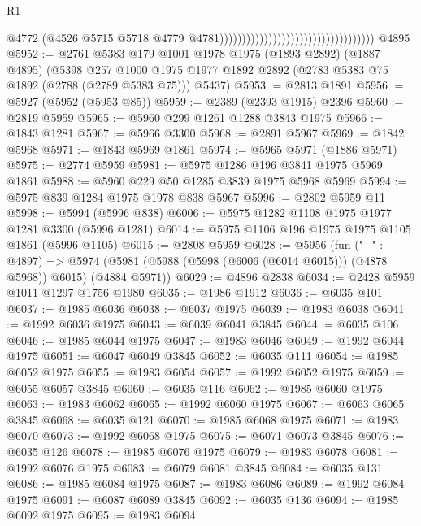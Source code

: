 \begin{lexlean}{R1}
\begin{coremodule}
                                                                        @4772
                                                                        (@4526
                                                                          @5715
                                                                          @5718
                                                                          @4779
                                                                          @4781)))))))))))))))))))))))))))))))))))
    @4895
@5952 := @2761
    @5383
    @179
    @1001
    @1978
    @1975
    (@1893 @2892)
    (@1887 @4895)
    (@5398
      @257
      @1000
      @1975
      @1977
      @1892
      @2892
      (@2783 @5383 @75 @1892 (@2788 (@2789 @5383 @75)))
      @5437)
@5953 := @2813 @1891
@5956 := @5927 (@5952 (@5953 @85))
@5959 := @2389 (@2393 @1915) @2396
@5960 := @2819 @5959
@5965 := @5960 @299 @1261 @1288 @3843 @1975
@5966 := @1843 @1281
@5967 := @5966 @3300
@5968 := @2891 @5967
@5969 := @1842 @5968
@5971 := @1843 @5969 @1861
@5974 := @5965 @5971 (@1886 @5971)
@5975 := @2774 @5959
@5981 := @5975 @1286 @196 @3841 @1975 @5969 @1861
@5988 := @5960 @229 @50 @1285 @3839 @1975 @5968 @5969
@5994 := @5975 @839 @1284 @1975 @1978 @838 @5967
@5996 := @2802 @5959 @11
@5998 := @5994 (@5996 @838)
@6006 := @5975 @1282 @1108 @1975 @1977 @1281 @3300 (@5996 @1281)
@6014 := @5975 @1106 @196 @1975 @1975 @1105 @1861 (@5996 @1105)
@6015 := @2808 @5959
@6028 := @5956
    (fun ("_" : @4897) =>
    @5974 (@5981 (@5988 (@5998 (@6006 (@6014 @6015))) (@4878 @5968)) @6015) (@4884 @5971))
@6029 := @4896 @2838
@6034 := @2428 @5959 @1011 @1297 @1756 @1980
@6035 := @1986 @1912
@6036 := @6035 @101
@6037 := @1985 @6036
@6038 := @6037 @1975
@6039 := @1983 @6038
@6041 := @1992 @6036 @1975
@6043 := @6039 @6041 @3845
@6044 := @6035 @106
@6046 := @1985 @6044 @1975
@6047 := @1983 @6046
@6049 := @1992 @6044 @1975
@6051 := @6047 @6049 @3845
@6052 := @6035 @111
@6054 := @1985 @6052 @1975
@6055 := @1983 @6054
@6057 := @1992 @6052 @1975
@6059 := @6055 @6057 @3845
@6060 := @6035 @116
@6062 := @1985 @6060 @1975
@6063 := @1983 @6062
@6065 := @1992 @6060 @1975
@6067 := @6063 @6065 @3845
@6068 := @6035 @121
@6070 := @1985 @6068 @1975
@6071 := @1983 @6070
@6073 := @1992 @6068 @1975
@6075 := @6071 @6073 @3845
@6076 := @6035 @126
@6078 := @1985 @6076 @1975
@6079 := @1983 @6078
@6081 := @1992 @6076 @1975
@6083 := @6079 @6081 @3845
@6084 := @6035 @131
@6086 := @1985 @6084 @1975
@6087 := @1983 @6086
@6089 := @1992 @6084 @1975
@6091 := @6087 @6089 @3845
@6092 := @6035 @136
@6094 := @1985 @6092 @1975
@6095 := @1983 @6094

\end{coremodule}
\end{lexlean}
